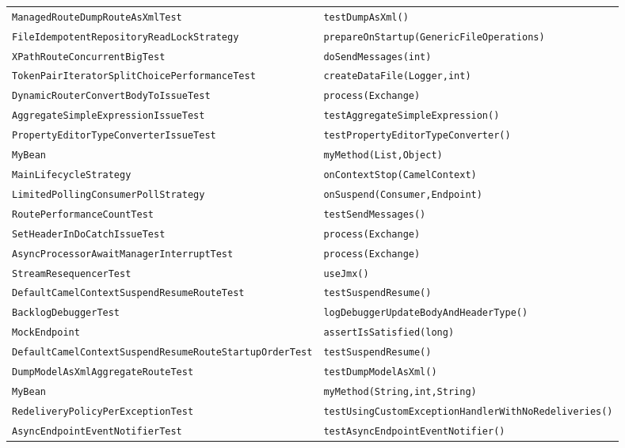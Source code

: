 \begin{center}
\begin{longtable}{ll}
\lstinline/ManagedRouteDumpRouteAsXmlTest/&{\lstinline/testDumpAsXml()/}\\
\lstinline/FileIdempotentRepositoryReadLockStrategy/&{\lstinline/prepareOnStartup(GenericFileOperations)/}\\
\lstinline/XPathRouteConcurrentBigTest/&{\lstinline/doSendMessages(int)/}\\
\lstinline/TokenPairIteratorSplitChoicePerformanceTest/&{\lstinline/createDataFile(Logger,int)/}\\
\lstinline/DynamicRouterConvertBodyToIssueTest/&{\lstinline/process(Exchange)/}\\
\lstinline/AggregateSimpleExpressionIssueTest/&{\lstinline/testAggregateSimpleExpression()/}\\
\lstinline/PropertyEditorTypeConverterIssueTest/&{\lstinline/testPropertyEditorTypeConverter()/}\\
\lstinline/MyBean/&{\lstinline/myMethod(List,Object)/}\\
\lstinline/MainLifecycleStrategy/&{\lstinline/onContextStop(CamelContext)/}\\
\lstinline/LimitedPollingConsumerPollStrategy/&{\lstinline/onSuspend(Consumer,Endpoint)/}\\
\lstinline/RoutePerformanceCountTest/&{\lstinline/testSendMessages()/}\\
\lstinline/SetHeaderInDoCatchIssueTest/&{\lstinline/process(Exchange)/}\\
\lstinline/AsyncProcessorAwaitManagerInterruptTest/&{\lstinline/process(Exchange)/}\\
\lstinline/StreamResequencerTest/&{\lstinline/useJmx()/}\\
\lstinline/DefaultCamelContextSuspendResumeRouteTest/&{\lstinline/testSuspendResume()/}\\
\lstinline/BacklogDebuggerTest/&{\lstinline/logDebuggerUpdateBodyAndHeaderType()/}\\
\lstinline/MockEndpoint/&{\lstinline/assertIsSatisfied(long)/}\\
\lstinline/DefaultCamelContextSuspendResumeRouteStartupOrderTest/&{\lstinline/testSuspendResume()/}\\
\lstinline/DumpModelAsXmlAggregateRouteTest/&{\lstinline/testDumpModelAsXml()/}\\
\lstinline/MyBean/&{\lstinline/myMethod(String,int,String)/}\\
\lstinline/RedeliveryPolicyPerExceptionTest/&{\lstinline/testUsingCustomExceptionHandlerWithNoRedeliveries()/}\\
\lstinline/AsyncEndpointEventNotifierTest/&{\lstinline/testAsyncEndpointEventNotifier()/}\\

\end{longtable}
\end{center}

